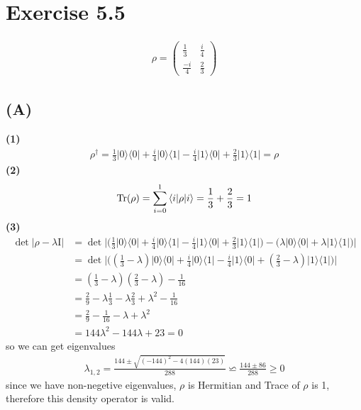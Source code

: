 \documentclass{article}
\newcommand{\op}[2]{|#1\rangle \langle#2|}
\newcommand{\sand}[3]{\braket{#1 | #2 | #3}}
\begin{document}
\section*{Exercise 5.5}
\begin{align*}
    \rho = 
    \begin{pmatrix}
        \displaystyle\frac{1}{3} & \displaystyle\frac{i}{4} \\[1em]
        \displaystyle\frac{-i}{4} & \displaystyle\frac{2}{3}
    \end{pmatrix}
\end{align*}
\subsection*{(A)}
\textbf{(1)}
\begin{align*}
    \rho^\dagger = \frac{1}{3}\op{0}{0} + \frac{i}{4}\op{0}{1} - \frac{i}{4}\op{1}{0} + \frac{2}{3}\op{1}{1} = \rho
\end{align*}
\textbf{(2)}
\begin{align*}
    \text{Tr}(\rho) = \sum_{i=0}^{1} \sand{i}{\rho}{i} = \frac{1}{3} + \frac{2}{3} = 1
\end{align*}
\textbf{(3)}
\begin{align*}
    \det |\rho - \lambda\text{I}| &= \det \bigg|\big(\frac{1}{3}\op{0}{0} + \frac{i}{4}\op{0}{1} - \frac{i}{4}\op{1}{0} + \frac{2}{3}\op{1}{1}\big)-\big(\lambda\op{0}{0}+\lambda\op{1}{1}\big)\bigg| \\
    &= \det \bigg|\big((\frac{1}{3}-\lambda)\op{0}{0} + \frac{i}{4}\op{0}{1} - \frac{i}{4}\op{1}{0} + (\frac{2}{3}-\lambda)\op{1}{1}\big)\bigg| \\
    &= (\frac{1}{3}-\lambda)(\frac{2}{3}-\lambda) - \frac{1}{16} \\
    &= \frac{2}{9} - \lambda\frac{1}{3} - \lambda\frac{2}{3} + \lambda^2 - \frac{1}{16} \\
    &= \frac{2}{9} - \frac{1}{16} - \lambda + \lambda^2 \\
    &= 144\lambda^2 - 144\lambda + 23 = 0
\end{align*}
so we can get eigenvalues
\begin{align*}
   \lambda_{1,2} = \frac{144 \pm \sqrt{(-144)^2 - 4(144)(23)}}{288} \backsimeq \frac{144 \pm 86}{288} \ge 0
\end{align*}
since we have non-negetive eigenvalues, $\rho$ is Hermitian and Trace of $\rho$ is 1, therefore this density operator is valid.
\end{document}
